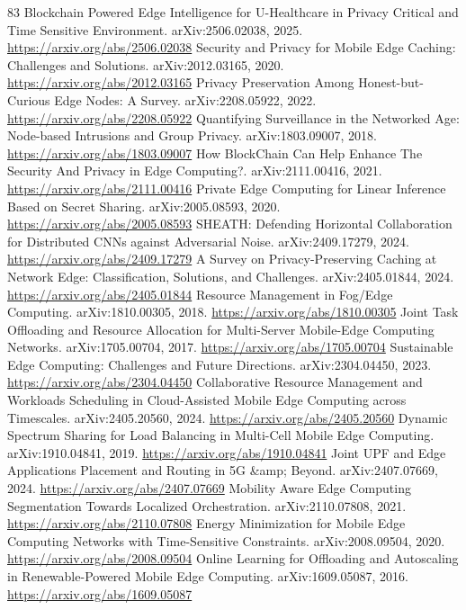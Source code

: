 \documentclass[11pt]{article}
\begin{document}
\begin{thebibliography}{83}
 Blockchain Powered Edge Intelligence for U-Healthcare in Privacy Critical and Time Sensitive Environment. arXiv:2506.02038, 2025. \url{https://arxiv.org/abs/2506.02038}
 Security and Privacy for Mobile Edge Caching: Challenges and Solutions. arXiv:2012.03165, 2020. \url{https://arxiv.org/abs/2012.03165}
 Privacy Preservation Among Honest-but-Curious Edge Nodes: A Survey. arXiv:2208.05922, 2022. \url{https://arxiv.org/abs/2208.05922}
 Quantifying Surveillance in the Networked Age: Node-based Intrusions and Group Privacy. arXiv:1803.09007, 2018. \url{https://arxiv.org/abs/1803.09007}
 How BlockChain Can Help Enhance The Security And Privacy in Edge Computing?. arXiv:2111.00416, 2021. \url{https://arxiv.org/abs/2111.00416}
 Private Edge Computing for Linear Inference Based on Secret Sharing. arXiv:2005.08593, 2020. \url{https://arxiv.org/abs/2005.08593}
 SHEATH: Defending Horizontal Collaboration for Distributed CNNs against Adversarial Noise. arXiv:2409.17279, 2024. \url{https://arxiv.org/abs/2409.17279}
 A Survey on Privacy-Preserving Caching at Network Edge: Classification, Solutions, and Challenges. arXiv:2405.01844, 2024. \url{https://arxiv.org/abs/2405.01844}
 Resource Management in Fog/Edge Computing. arXiv:1810.00305, 2018. \url{https://arxiv.org/abs/1810.00305}
 Joint Task Offloading and Resource Allocation for Multi-Server Mobile-Edge Computing Networks. arXiv:1705.00704, 2017. \url{https://arxiv.org/abs/1705.00704}
 Sustainable Edge Computing: Challenges and Future Directions. arXiv:2304.04450, 2023. \url{https://arxiv.org/abs/2304.04450}
 Collaborative Resource Management and Workloads Scheduling in Cloud-Assisted Mobile Edge Computing across Timescales. arXiv:2405.20560, 2024. \url{https://arxiv.org/abs/2405.20560}
 Dynamic Spectrum Sharing for Load Balancing in Multi-Cell Mobile Edge Computing. arXiv:1910.04841, 2019. \url{https://arxiv.org/abs/1910.04841}
 Joint UPF and Edge Applications Placement and Routing in 5G \&amp; Beyond. arXiv:2407.07669, 2024. \url{https://arxiv.org/abs/2407.07669}
 Mobility Aware Edge Computing Segmentation Towards Localized Orchestration. arXiv:2110.07808, 2021. \url{https://arxiv.org/abs/2110.07808}
 Energy Minimization for Mobile Edge Computing Networks with Time-Sensitive Constraints. arXiv:2008.09504, 2020. \url{https://arxiv.org/abs/2008.09504}
 Online Learning for Offloading and Autoscaling in Renewable-Powered Mobile Edge Computing. arXiv:1609.05087, 2016. \url{https://arxiv.org/abs/1609.05087}

\end{thebibliography}
\end{document}
